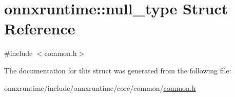 \hypertarget{structonnxruntime_1_1null__type}{}\section{onnxruntime\+:\+:null\+\_\+type Struct Reference}
\label{structonnxruntime_1_1null__type}


{\ttfamily \#include $<$common.\+h$>$}



The documentation for this struct was generated from the following file\+:\begin{DoxyCompactItemize}
\item 
onnxruntime/include/onnxruntime/core/common/\mbox{\hyperlink{include_2onnxruntime_2core_2common_2common_8h}{common.\+h}}\end{DoxyCompactItemize}

